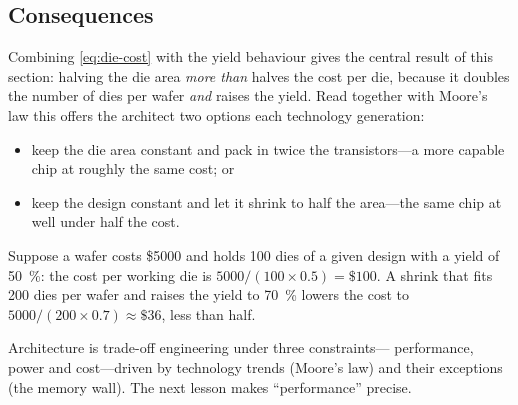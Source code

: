 \documentclass[../main.tex]{subfiles}
\begin{document}
\subsection{Consequences}

Combining \cref{eq:die-cost} with the yield behaviour gives the central
result of this section: halving the die area \emph{more than} halves the
cost per die, because it doubles the number of dies per wafer \emph{and}
raises the yield.  Read together with Moore's law this offers the architect
two options each technology generation:
\begin{itemize}
  \item keep the die area constant and pack in twice the transistors---a
    more capable chip at roughly the same cost; or
  \item keep the design constant and let it shrink to half the area---the
    same chip at well under half the cost.
\end{itemize}

\begin{example}
  Suppose a wafer costs \$5000 and holds 100 dies of a given design with a
  yield of \SI{50}{\percent}: the cost per working die is
  $5000/(100\times 0.5) = \$100$.  A shrink that fits 200 dies per wafer and
  raises the yield to \SI{70}{\percent} lowers the cost to
  $5000/(200\times 0.7) \approx \$36$, less than half.
\end{example}

\begin{keypoint}
  Architecture is trade-off engineering under three constraints---
  performance, power and cost---driven by technology trends (Moore's law) and
  their exceptions (the memory wall).  The next lesson makes
  \enquote{performance} precise.
\end{keypoint}
\end{document}
